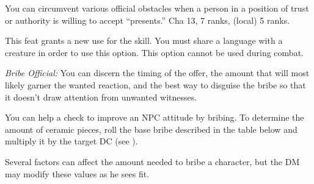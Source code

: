 {You can circumvent various official obstacles when a person in a position of trust or authority is willing to accept ``presents.''}
{Cha 13,  7 ranks,  (local) 5 ranks.}
{This feat grants a new use for the  skill. You must share a language with a creature in order to use this option. This option cannot be used during combat.



\textit{Bribe Official:} You can discern the timing of the offer, the amount that will most likely garner the wanted reaction, and the best way to disguise the bribe so that it doesn't draw attention from unwanted witnesses.

You can help a  check to improve an NPC attitude by bribing. To determine the amount of ceramic pieces, roll the base bribe described in the table below and multiply it by the target DC (see ).


Several factors can affect the amount needed to bribe a character, but the DM may modify these values as he sees fit.

}{}{}

